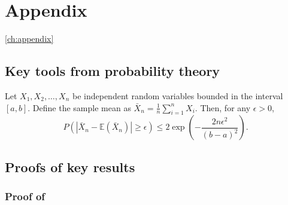 
\chapter{Appendix}\ref{ch:appendix}

\section{Key tools from probability theory}

\label{sec:hoeffding}

\begin{theorem}
Let $X_1, X_2, \ldots, X_n$ be independent random variables bounded in the interval $[a, b]$. Define the sample mean as $\bar{X}_n = \frac{1}{n}\sum_{i=1}^{n} X_i$. Then, for any $\epsilon > 0$, 
$$P\left(\left|\bar{X}_n - \mathbb{E}(\bar{X}_n)\right| \geq \epsilon\right) \leq 2 \exp\left(-\frac{2n\epsilon^2}{(b - a)^2}\right).$$
\end{theorem}

\section{Proofs of key results}

\subsection{Proof of }
\label{app:proof_theorem_a}


